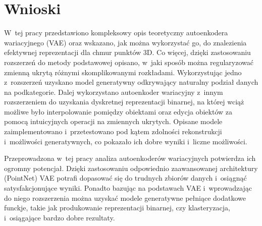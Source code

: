 \documentclass{iithesis}
\begin{document}
\chapter{Wnioski}
W~tej pracy przedstawiono kompleksowy opis teoretyczny autoenkodera wariacyjnego (VAE)
oraz wskazano, jak można wykorzystać go, do znalezienia efektywnej reprezentacji dla
chmur punktów 3D. Co więcej, dzięki zastosowaniu rozszerzeń do metody podstawowej
opisano, w~jaki sposób można regularyzować zmienną ukrytą różnymi skomplikowanymi rozkładami.
Wykorzystując jedno z~rozszerzeń uzyskano model generatywny odkrywający
naturalny podział danych na podkategorie.
Dalej wykorzystano autoenkoder wariacyjny z~innym rozszerzeniem do uzyskania dyskretnej
reprezentacji binarnej, na której wciąż możliwe było interpolowanie pomiędzy obiektami
oraz edycja obiektów za pomocą intuicyjnych operacji na zmiennych ukrytych.
Opisane modele zaimplementowano i~przetestowano pod kątem zdolności rekonstrukcji i~możliwości
generatywnych, co pokazało ich dobre wyniki i~liczne możliwości.

Przeprowadzona w~tej pracy analiza autoenkoderów wariacyjnych potwierdza ich ogromny potencjał.
Dzięki zastosowaniu odpowiednio zaawansowanej architektury (PointNet) VAE potrafi dopasować
się do trudnych zbiorów danych i~osiągnąć satysfakcjonujące wyniki.
Ponadto bazując na podstawach VAE i~wprowadzając do niego rozszerzenia można uzyskać
modele generatywne pełniące dodatkowe funckje, takie jak produkowanie reprezentacji binarnej,
czy klasteryzacja, i~osiągające bardzo dobre rezultaty.

\clearpage



\end{document}
